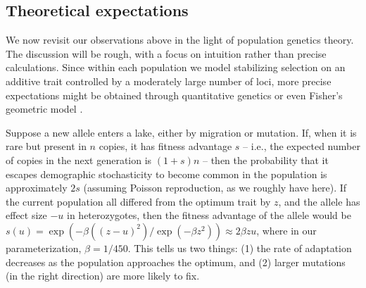\documentclass{article}
\begin{document}
\subsection*{Theoretical expectations}

We now revisit our observations above
in the light of population genetics theory.
The discussion will be rough,
with a focus on intuition rather than precise calculations.
Since within each population we model stabilizing selection on an additive trait
controlled by a moderately large number of loci,
more precise expectations might be obtained through quantitative genetics \citep{svardal2014general}
or even Fisher's geometric model \citep{barton2001hybridization,chevin2014niche}.

Suppose a new allele enters a lake, either by migration or mutation. 
If, when it is rare but present in $n$ copies, it has fitness advantage $s$ 
-- i.e., the expected number of copies in the next generation is $(1+s)n$ 
-- then the probability that it escapes demographic stochasticity to become common in the population 
is approximately $2s$ \citep{lambert2006probability,haldane1927mathematical}
(assuming Poisson reproduction, as we roughly have here).
If the current population all differed from the optimum trait by $z$, 
and the allele has effect size $-u$ in heterozygotes, 
then the fitness advantage of the allele would be $s(u) = \exp(-\beta((z - u)^2) / \exp( - \beta z^2)) \approx 2 \beta z u$, where in our parameterization, $\beta = 1 / 450$. 
This tells us two things: (1) the rate of adaptation decreases as the population approaches the optimum, and (2) larger mutations (in the right direction) are more likely to fix.
\end{document}
